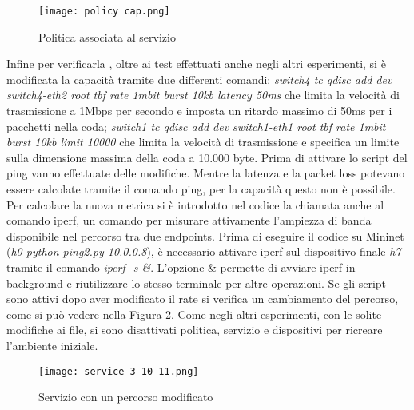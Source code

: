 \begin{figure}[h]
    \centering
   \texttt{[image: policy cap.png]}
    \caption{Politica associata al servizio}
    \label{fig:policy cap}
\end{figure}
Infine per verificarla , oltre ai test effettuati anche negli altri esperimenti, 
si è modificata la capacità tramite due differenti comandi: \textit{switch4 tc qdisc add dev switch4-eth2 root tbf rate 1mbit burst 10kb latency 50ms} che 
limita la velocità di trasmissione a 1Mbps per secondo e imposta un ritardo massimo di 50ms per i pacchetti nella coda; 
\textit{switch1 tc qdisc add dev switch1-eth1 root tbf rate 1mbit burst 10kb limit 10000} che
limita la velocità di trasmissione e specifica un limite sulla dimensione massima della coda a 10.000 byte.
\newline Prima di attivare lo script del ping vanno effettuate delle modifiche.
Mentre la latenza e la packet loss potevano essere calcolate tramite il comando ping, per la capacità questo non è possibile.
Per calcolare la nuova metrica si è introdotto nel codice la chiamata anche al comando iperf,
un comando per misurare attivamente l'ampiezza di banda disponibile nel percorso tra due endpoints.
Prima di eseguire il codice su Mininet (\textit{h0 python ping2.py 10.0.0.8}), è necessario attivare iperf sul dispositivo finale \textit{h7} tramite il comando \textit{iperf -s \&}.
L'opzione \& permette di avviare iperf in background e riutilizzare lo stesso terminale per altre operazioni.
Se gli script sono attivi dopo aver modificato il rate si verifica un cambiamento del percorso,
come si può vedere nella Figura \ref{fig:abilene post}.
Come negli altri esperimenti, con le solite modifiche ai file, si sono disattivati politica, servizio e dispositivi per ricreare l'ambiente iniziale.
\begin{figure}[h]
    \centering
   \texttt{[image: service 3 10 11.png]}
    \caption{Servizio con un percorso modificato}
    \label{fig:abilene post}
\end{figure}


